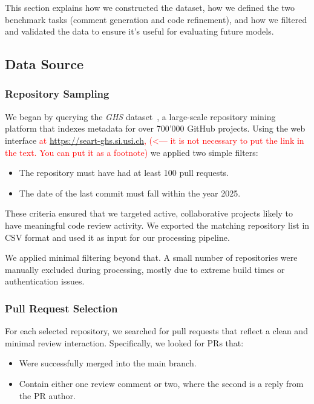 This section explains how we constructed the dataset, how we defined the two benchmark tasks
(comment generation and code refinement), and how we filtered and validated the data to ensure it’s
useful for evaluating future models.


\subsection{Data Source}

\subsubsection{Repository Sampling}

We began by querying the \textit{GHS} dataset~\cite{Dabic:msr2021data}, a large-scale repository
mining platform that indexes metadata for over 700'000 GitHub projects. Using the web interface \textcolor{red}{at
\url{https://seart-ghs.si.usi.ch}, (<--- it is not necessary to put the link in the text. You can put it as a footnote)} we applied two simple filters:

\begin{itemize}
	\item The repository must have had at least 100 pull requests.
	\item The date of the last commit must fall within the year 2025.
\end{itemize}

These criteria ensured that we targeted active, collaborative projects likely to have meaningful
code review activity. We exported the matching repository list in CSV format and used it as input
for our processing pipeline.

We applied minimal filtering beyond that. A small number of repositories were manually excluded
during processing, mostly due to extreme build times or authentication issues.

\subsubsection{Pull Request Selection}
\label{sec:pr-selection}

For each selected repository, we searched for pull requests that reflect a clean and minimal review
interaction. Specifically, we looked for PRs that:

\begin{itemize}
	\item Were successfully merged into the main branch.
	\item Contain either one review comment or two, where the second is a reply from the PR author.
\end{itemize}

